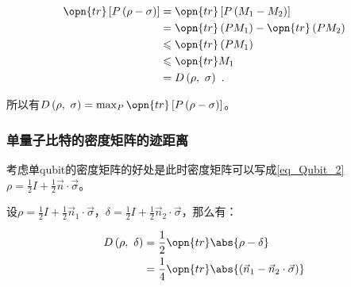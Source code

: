 \begin{equation}
\begin{aligned}
\opn{tr} \left[ P\left(\rho - \sigma\right) \right] &= \opn{tr}\left[ P\left(M_1 - M_2\right) \right] \\
&= \opn{tr}\left(PM_1\right) - \opn{tr}\left(PM_2\right) \\
&\leqslant \opn{tr}\left(PM_1\right) \\
&\leqslant \opn{tr}M_1 \\
&= D\left( \rho,~\sigma \right)~.
\end{aligned}~
\end{equation}

所以有$D\left(\rho,~\sigma\right) = \max_{ P } \opn{tr}\left[P\left(\rho - \sigma\right)\right]$。

\subsubsection{单量子比特的密度矩阵的迹距离}

考虑单qubit的密度矩阵的好处是此时密度矩阵可以写成\autoref{eq_Qubit_2}~$\rho = \frac{1}{2}I + \frac{1}{2}\vec{n}\cdot \vec{\sigma}$。

设$\rho = \frac{1}{2}I + \frac{1}{2}\vec{n}_1\cdot \vec{\sigma}$，$\delta = \frac{1}{2}I + \frac{1}{2}\vec{n}_2\cdot \vec{\sigma}$，那么有：

\begin{equation}
\begin{aligned}
D\left(\rho,~\delta\right) &= \frac{1}{2}\opn{tr}\abs{\rho - \delta} \\
&= \frac{1}{4}\opn{tr}\abs{\left(\vec{n}_1 - \vec{n}_2 \cdot \vec{\sigma}\right)}
\end{aligned}~
\end{equation}




